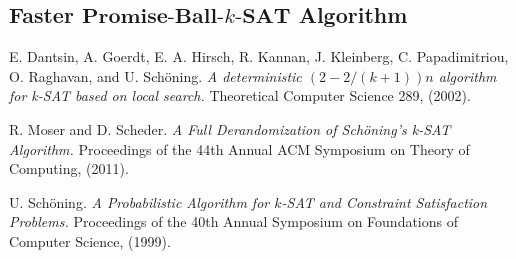 \documentclass[a4paper,12pts]{article}
\newcommand{\SATbf}{\textbf{$k$-SAT}}
\newcommand{\PBSbf}{\textbf{Promise-Ball-$\SATbf$}}
\begin{document}
\subsection{Faster $\PBSbf$ Algorithm}


\begin{thebibliography}{9}
E. Dantsin, A. Goerdt, E. A. Hirsch, R. Kannan, J. Kleinberg, C. Papadimitriou, O. Raghavan, and U. Sch\"{o}ning. 
\textit{A deterministic $(2-2/(k+1))n$ algorithm for k-SAT based on local search.} Theoretical Computer Science 289, (2002).

R. Moser and D. Scheder.
\textit{A Full Derandomization of Sch\"{o}ning’s k-SAT Algorithm.} Proceedings of the 44th Annual ACM Symposium on Theory of Computing, (2011).

U. Sch\"{o}ning.
\textit{A Probabilistic Algorithm for $k$-SAT and Constraint Satisfaction Problems.} Proceedings of the 40th Annual Symposium on Foundations of Computer Science, (1999).

\end{thebibliography}
\end{document}
